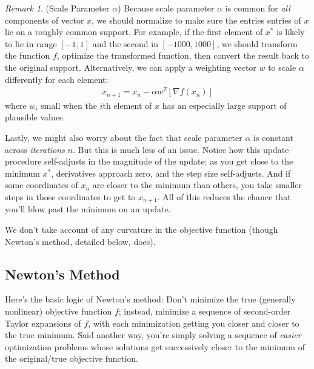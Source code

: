 \documentclass[12pt]{article}
\numberwithin{equation}{section} %
\theoremstyle{plain}
\theoremstyle{definition}
\theoremstyle{remark}
\newtheorem*{rmk}{Remark}
\begin{document}
\begin{rmk}(Scale Parameter $\alpha$)
Because scale parameter $\alpha$ is common for \emph{all} components of
vector $x$, we should normalize to make sure the entries entries of $x$
lie on a roughly common support.
For example, if the first element of $x^*$ is likely to lie in range
$[-1,1]$ and the second in $[-1000,1000]$, we should transform the
function $f$, optimize the transformed function, then convert the result
back to the original support.  Alternatively, we can apply a weighting
vector $w$ to scale $\alpha$ differently for each element:
\begin{align}
  x_{n+1} = x_n - \alpha w^T [\nabla f(x_n)]
\end{align}
where $w_i$ small when the $i$th element of $x$ has an especially large
support of plausible values.

Lastly, we might also worry about the fact that scale parameter $\alpha$
is constant across \emph{iterations} $n$.
But this is much less of an issue.
Notice how this update procedure self-adjusts in the magnitude of the
update: as you get close to the minimum $x^*$, derivatives approach
zero, and the step size self-adjusts.  And if some coordinates of $x_n$
are closer to the minimum than others, you take smaller steps in those
coordinates to get to $x_{n+1}$.  All of this reduces the chance that
you'll blow past the minimum on an update.
\end{rmk}

We don't take account of any curvature in the objective function (though
Newton's method, detailed below, does).


\clearpage
\subsection{Newton's Method}

Here's the basic logic of Newton's method: Don't minimize the true
(generally nonlinear) objective function $f$; instead, minimize a
sequence of second-order Taylor expansions of $f$, with each
minimization getting you closer and closer to the true minimum.
Said another way, you're simply solving a sequence of \emph{easier}
optimization problems whose solutions get successively closer to the
minimum of the original/true objective function.
\end{document}
